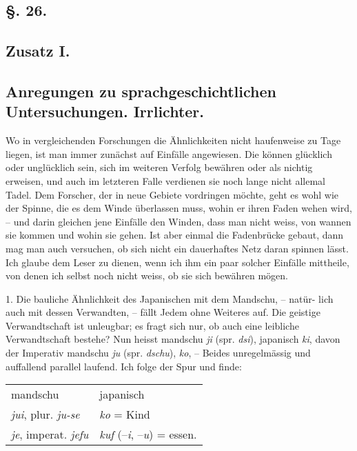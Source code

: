 {
\subsection*{§. 26.}\label{III.II.II.26}
\subsection*{Zusatz I.}
\subsection*{Anregungen zu sprachgeschichtlichen Untersuchungen. Irrlichter.}
Wo in vergleichenden Forschungen die Ähnlichkeiten nicht haufenweise zu Tage liegen, ist man immer zunächst auf Einfälle angewiesen. Die können glücklich oder unglücklich sein, sich im weiteren Verfolg bewähren oder als nichtig erweisen, und auch im letzteren Falle verdienen sie noch lange nicht allemal Tadel. Dem Forscher, der in neue Gebiete vordringen möchte, geht es wohl wie der Spinne, die es dem Winde überlassen muss, wohin er ihren Faden wehen wird, – und darin \label{fp.284} gleichen jene Einfälle den Winden, dass man nicht weiss, von wannen sie kommen und wohin sie gehen. Ist aber einmal die Fadenbrücke gebaut, dann mag man auch versuchen, ob sich nicht ein dauerhaftes Netz daran spinnen lässt. Ich glaube dem Leser zu dienen, wenn ich ihm ein paar solcher Einfälle mittheile, von denen ich selbst noch nicht weiss, ob sie sich bewähren mögen.

1. Die bauliche Ähnlichkeit des Japanischen mit dem Mandschu, – natür- \label{sp.290} lich auch mit dessen Verwandten, – fällt Jedem ohne Weiteres auf. Die geistige Verwandtschaft ist unleugbar; es fragt sich nur, ob auch eine leibliche Verwandtschaft bestehe? Nun heisst mandschu \textit{ji} (spr. \textit{dsi}), japanisch \textit{ki},  davon der Imperativ mandschu \textit{ju} (spr. \textit{dschu}),  \textit{ko}, – Beides unregelmässig und auffallend parallel laufend. Ich folge der Spur und finde:

\begin{center}
\begin{tabular}{ l@{\hskip 48pt} l }
mandschu & japanisch \\
\textit{jui}, plur. \textit{ju-se} & \textit{ko} = Kind \\
\textit{je}, imperat. \textit{jefu} & \textit{kuf} (–\textit{i}, –\textit{u}) = essen.
\end{tabular}
\end{center}

}
